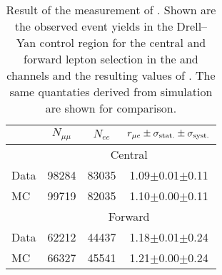 
\begin{table}[hbtp]
 \renewcommand{\arraystretch}{1.3}
 \setlength{\belowcaptionskip}{6pt}
 \centering
 \caption{Result of the measurement of \rmue. Shown are the observed event yields in the Drell--Yan control region for the central and forward lepton selection in the \EE and \MM channels and the resulting values of 
\rmue. The same quantaties derived from simulation are shown for comparison.}
  \label{tab:rMuE}
  \begin{tabular}{l| ccc }

    							& $N_{\mu\mu}$ &  $N_{ee}$ & $r_{\mu e} \pm \sigma_{\text{stat.}} \pm \sigma_{\text{syst.}}$ \\ 
    
    \hline
    							& \multicolumn{3}{c}{Central}  \\ 

    \hline
        Data       &  98284                   & 83035              &  1.09$\pm$0.01$\pm$0.11    \\

        MC       &  99719                   & 82035              &  1.10$\pm$0.00$\pm$0.11    \\

\hline
    							& \multicolumn{3}{c}{Forward}  \\ 

    \hline
        Data       &  62212                   & 44437              &  1.18$\pm$0.01$\pm$0.24    \\

        MC       &  66327                   & 45541              &  1.21$\pm$0.00$\pm$0.24    \\

  \end{tabular}
\end{table}


